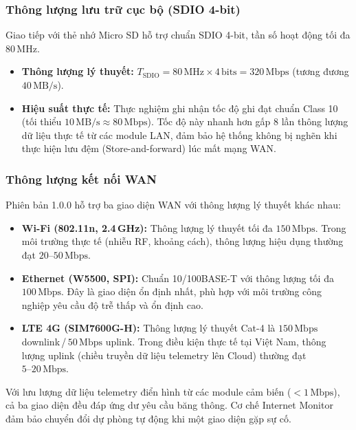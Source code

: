 \subsubsection{Thông lượng lưu trữ cục bộ (SDIO 4-bit)}
Giao tiếp với thẻ nhớ Micro SD hỗ trợ chuẩn SDIO 4-bit, tần số hoạt động tối đa $80 \, \text{MHz}$.
\begin{itemize}
    \item \textbf{Thông lượng lý thuyết:} $T_{\text{SDIO}} = 80 \, \text{MHz} \times 4 \, \text{bits} = 320 \, \text{Mbps}$ (tương đương $40 \, \text{MB/s}$).
    \item \textbf{Hiệu suất thực tế:} Thực nghiệm ghi nhận tốc độ ghi đạt chuẩn Class 10 (tối thiểu $10 \, \text{MB/s} \approx 80 \, \text{Mbps}$). Tốc độ này nhanh hơn gấp 8 lần thông lượng dữ liệu thực tế từ các module LAN, đảm bảo hệ thống không bị nghẽn khi thực hiện lưu đệm (Store-and-forward) lúc mất mạng WAN.
\end{itemize}
\subsubsection{Thông lượng kết nối WAN}
Phiên bản 1.0.0 hỗ trợ ba giao diện WAN với thông lượng lý thuyết khác nhau:
\begin{itemize}
    \item \textbf{Wi-Fi (802.11n, 2.4\,GHz):} Thông lượng lý thuyết tối đa $150 \, \text{Mbps}$. Trong môi trường thực tế (nhiễu RF, khoảng cách), thông lượng hiệu dụng thường đạt $20\text{--}50 \, \text{Mbps}$.
    \item \textbf{Ethernet (W5500, SPI):} Chuẩn 10/100BASE-T với thông lượng tối đa $100 \, \text{Mbps}$. Đây là giao diện ổn định nhất, phù hợp với môi trường công nghiệp yêu cầu độ trễ thấp và ổn định cao.
    \item \textbf{LTE 4G (SIM7600G-H):} Thông lượng lý thuyết Cat-4 là $150 \, \text{Mbps}$ downlink\,/\,$50 \, \text{Mbps}$ uplink. Trong điều kiện thực tế tại Việt Nam, thông lượng uplink (chiều truyền dữ liệu telemetry lên Cloud) thường đạt $5\text{--}20 \, \text{Mbps}$.
\end{itemize}
Với lưu lượng dữ liệu telemetry điển hình từ các module cảm biến ($< 1 \, \text{Mbps}$), cả ba giao diện đều đáp ứng dư yêu cầu băng thông. Cơ chế Internet Monitor đảm bảo chuyển đổi dự phòng tự động khi một giao diện gặp sự cố.

